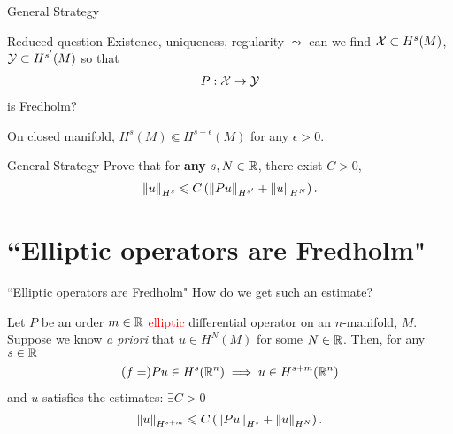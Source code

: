 \documentclass{beamer}
\begin{document}
\begin{frame}{General Strategy}
\begin{block}{Reduced question} 
    Existence, uniqueness, regularity $ \leadsto $ can we find $\X \subset H^s(M)$, $\Y \subset H^{s'}(M)$ so that 
    \begin{align*}
    P: \X \to \Y 
    \end{align*}
    is Fredholm? 
\end{block}
On closed manifold, $H^s(M) \Subset H^{s - \epsilon}(M)$ for any $\epsilon > 0$. 
\begin{block}{General Strategy}
    Prove that for \textbf{any} $s, N \in \R$, there exist $C > 0$, 
    \begin{align*}
    \norm[u]_{H^s} \leq C \brac{\norm[Pu]_{H^{s'}} + \norm[u]_{H^{N}}}. 
    \end{align*}    
\end{block}

\end{frame} 


\section{``Elliptic operators are Fredholm"} 
\begin{frame}{``Elliptic operators are Fredholm"} 
How do we get such an estimate? 

\begin{theorem}
    Let $P$ be an order $m \in \R$ \textcolor<2->{red}{ elliptic}  differential operator on an $n$-manifold, $M$. Suppose we know \textit{a priori} that $u \in H^{N}(M)$ for some $N \in \R$. Then, for any $s \in \R$
    \begin{align*}
    (f = ) Pu \in H^{s}(\R^n) \implies u \in H^{s + m}(\R^n)
    \end{align*}
    and $u$ satisfies the estimates: $\exists C > 0$
    \begin{align*}
    \norm[u]_{H^{s + m}} \leq C \brac{\norm[Pu]_{H^s} + \norm[u]_{H^N}}. 
    \end{align*}
\end{theorem}

\end{frame} 
\end{document}
